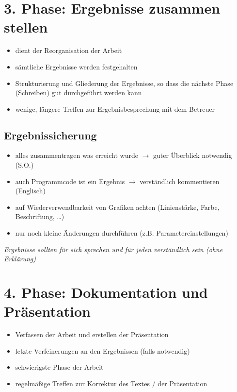 \section*{3. Phase: Ergebnisse zusammen stellen}
\label{sec:Ergebnisse}
\begin{itemize}
	\item dient der Reorganisation der Arbeit
	\item sämtliche Ergebnisse werden festgehalten
	\item Strukturierung und Gliederung der Ergebnisse, so dass die nächste Phase (Schreiben) gut durchgeführt werden kann
	\item wenige, längere Treffen zur Ergebnisbesprechung mit dem Betreuer
\end{itemize}


\subsection*{Ergebnissicherung}
\label{sec:Ergebnissicherung}
\begin{itemize}
	\item alles zusammentragen was erreicht wurde $\rightarrow$ guter Überblick notwendig (S.O.)
	\item auch Programmcode ist ein Ergebnis $\rightarrow$ verständlich kommentieren (Englisch)
	\item auf  Wiederverwendbarkeit von Grafiken achten (Linienstärke, Farbe, Beschriftung, \ldots)
	\item nur noch kleine Änderungen durchführen (z.B. Parametereinstellungen)
\end{itemize}
\emph{Ergebnisse sollten für sich sprechen und für jeden verständlich sein (ohne Erklärung)}


\section*{4. Phase: Dokumentation und Präsentation}
\label{sec:Dokumentation}
\begin{itemize}
	\item Verfassen der Arbeit und erstellen der Präsentation
	\item letzte Verfeinerungen an den Ergebnissen (falls notwendig)
	\item schwierigste Phase der Arbeit
	\item regelmäßige Treffen zur Korrektur des Textes / der Präsentation
\end{itemize}

